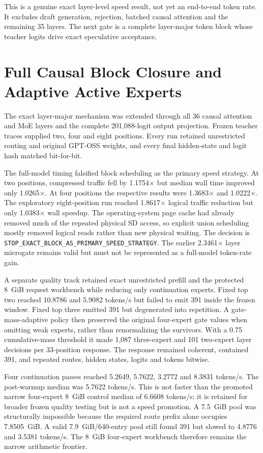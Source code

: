 This is a genuine exact layer-level speed result, not yet an end-to-end token
rate.  It excludes draft generation, rejection, batched causal attention and
the remaining 35 layers.  The next gate is a complete layer-major token block
whose teacher logits drive exact speculative acceptance.

\section{Full Causal Block Closure and Adaptive Active Experts}

The exact layer-major mechanism was extended through all 36 causal attention
and MoE layers and the complete 201,088-logit output projection.  Frozen teacher
traces supplied two, four and eight positions.  Every run retained unrestricted
routing and original GPT-OSS weights, and every final hidden-state and logit
hash matched bit-for-bit.

The full-model timing falsified block scheduling as the primary speed strategy.
At two positions, compressed traffic fell by 1.1754$\times$ but median wall time
improved only 1.0265$\times$.  At four positions the respective results were
1.3683$\times$ and 1.0222$\times$.  The exploratory eight-position run reached
1.8617$\times$ logical traffic reduction but only 1.0383$\times$ wall speedup.
The operating-system page cache had already removed much of the repeated
physical SD access, so explicit union scheduling mostly removed logical reads
rather than new physical waiting.  The decision is
\texttt{STOP\_EXACT\_BLOCK\_AS\_PRIMARY\_SPEED\_STRATEGY}.  The earlier
2.3461$\times$ layer microgate remains valid but must not be represented as a
full-model token-rate gain.

A separate quality track retained exact unrestricted prefill and the protected
8~GiB request workbench while reducing only continuation experts.  Fixed top
two reached 10.8786 and 5.9082 tokens/s but failed to emit 391 inside the frozen
window.  Fixed top three emitted 391 but degenerated into repetition.  A
gate-mass-adaptive policy then preserved the original four-expert gate values
when omitting weak experts, rather than renormalizing the survivors.  With a
0.75 cumulative-mass threshold it made 1,087 three-expert and 101 two-expert
layer decisions per 33-position response.  The response remained coherent,
contained 391, and repeated routes, hidden states, logits and tokens bitwise.

Four continuation passes reached 5.2649, 5.7622, 3.2772 and 8.3831 tokens/s.
The post-warmup median was 5.7622 tokens/s.  This is not faster than the promoted
narrow four-expert 8~GiB control median of 6.6608 tokens/s; it is retained for
broader frozen quality testing but is not a speed promotion.  A 7.5~GiB pool was
structurally impossible because the required route prefix alone occupies
7.8505~GiB.  A valid 7.9~GiB/640-entry pool still found 391 but slowed to 4.8776
and 3.5381 tokens/s.  The 8~GiB four-expert workbench therefore remains the
narrow arithmetic frontier.

